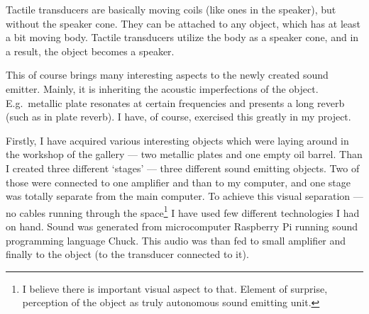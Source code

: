 \documentclass[12pt,a4paper,oneside]{report}
\begin{document}
Tactile transducers are basically moving coils (like ones in the speaker), but without the speaker cone. They can be attached to any object, which has at least a bit moving body. Tactile transducers utilize the body as a speaker cone, and in a result, the object becomes a speaker. 

This of course brings many interesting aspects to the newly created sound emitter. Mainly, it is inheriting the acoustic imperfections of the object. E.g.\ metallic plate resonates at certain frequencies and presents a long reverb (such as in plate reverb). I have, of course, exercised this greatly in my project.

Firstly, I have acquired various interesting objects which were laying around in the workshop of the gallery --- two metallic plates and one empty oil barrel. Than I created three different `stages' --- three different sound emitting objects. Two of those were connected to one amplifier and than to my computer, and one stage was totally separate from the main computer. To achieve this visual separation --- no cables running through the space\footnote{I believe there is important visual aspect to that. Element of surprise, perception of the object as truly autonomous sound emitting unit.} I have used few different technologies I had on hand. Sound was generated from microcomputer Raspberry Pi running sound programming language Chuck. This audio was than fed to small amplifier and finally to the object (to the transducer connected to it).
\end{document}
